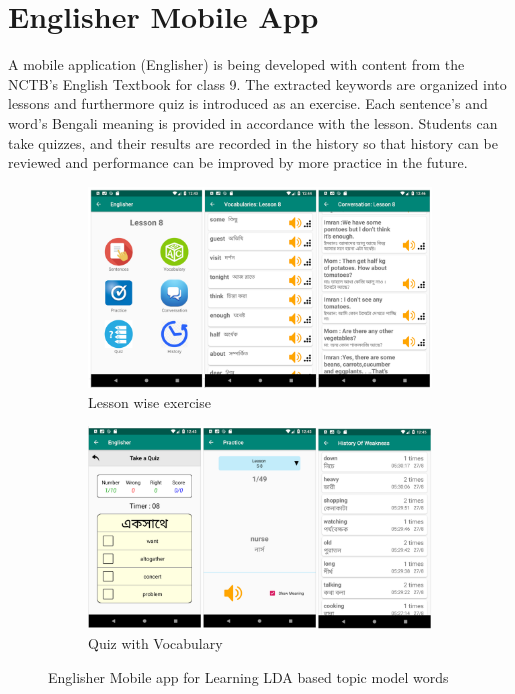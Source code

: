 \documentclass[sn-mathphys,Numbered]{sn-jnl}%
\theoremstyle{thmstyleone}%
\theoremstyle{thmstyletwo}%
\theoremstyle{thmstylethree}%
\begin{document}
\section{Englisher Mobile App}
A mobile application (Englisher) is being developed with content from the NCTB’s English Textbook for class 9. The extracted keywords are organized into lessons and furthermore quiz is introduced as an exercise. Each sentence's and word's Bengali meaning is provided in accordance with the lesson. Students can take quizzes, and their results are recorded in the history so that history can be reviewed and performance can be improved by more practice in the future. 

\begin{figure}[h!]
\centering
\begin{subfigure}{\textwidth}
	\centering
    \includegraphics[width=\textwidth]{mobile_app_01.png}
    \caption{Lesson wise exercise}
    \label{fig:first}
\end{subfigure}
\hfill
\begin{subfigure}{\textwidth}
	\centering
    \includegraphics[width=\textwidth]{mobile_app_02.png}
    \caption{Quiz with Vocabulary}
    \label{fig:second}
\end{subfigure}
        
\caption{Englisher Mobile app for Learning LDA based topic model words}
\label{fig:figures}
\end{figure}
\end{document}
